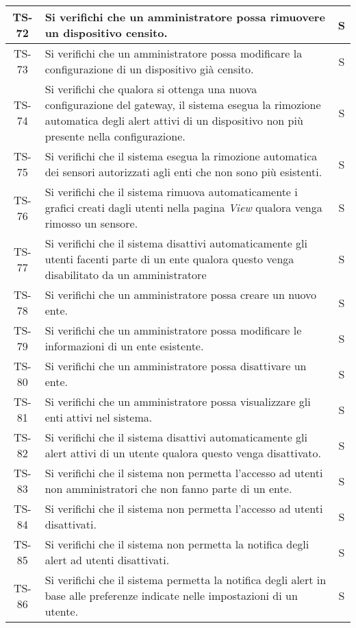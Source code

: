 \begin{center}
\begin{longtable}{|c|p{10cm}|c|}
			 \hline
			 TS-72 & Si verifichi che un amministratore possa rimuovere un dispositivo censito. & S \\
			 \hline
			 TS-73 & Si verifichi che un amministratore possa modificare la configurazione di un dispositivo già censito. & S \\
			 \hline
			 TS-74 & Si verifichi che qualora si ottenga una nuova configurazione del gateway, il sistema esegua la rimozione automatica degli alert attivi di un dispositivo non più presente nella configurazione. & S \\
			 \hline
			 TS-75 & Si verifichi che il sistema esegua la rimozione automatica dei sensori autorizzati agli enti che non sono più esistenti. & S \\
			 \hline
			 TS-76 & Si verifichi che il sistema rimuova automaticamente i grafici creati dagli utenti nella pagina \textit{View} qualora venga rimosso un sensore. & S \\
			 \hline
			 TS-77 & Si verifichi che il sistema disattivi automaticamente gli utenti facenti parte di un ente qualora questo venga disabilitato da un amministratore & S \\
			 \hline
			 TS-78 & Si verifichi che un amministratore possa creare un nuovo ente. & S \\
			 \hline
			 TS-79 & Si verifichi che un amministratore possa modificare le informazioni di un ente esistente. & S \\
			 \hline
			 TS-80 & Si verifichi che un amministratore possa disattivare un ente. & S \\
			 \hline
			 TS-81 & Si verifichi che un amministratore possa visualizzare gli enti attivi nel sistema. & S \\
			 \hline
			 TS-82 & Si verifichi che il sistema disattivi automaticamente gli alert attivi di un utente qualora questo venga disattivato. & S \\
			 \hline
			 TS-83 & Si verifichi che il sistema non permetta l'accesso ad utenti non amministratori che non fanno parte di un ente. & S \\
			 \hline
			 TS-84 & Si verifichi che il sistema non permetta l'accesso ad utenti disattivati. & S \\
			 \hline
			 TS-85 & Si verifichi che il sistema non permetta la notifica degli alert ad utenti disattivati. & S \\
			 \hline
			 TS-86 & Si verifichi che il sistema permetta la notifica degli alert in base alle preferenze indicate nelle impostazioni di un utente. & S \\

\end{longtable}
\end{center}
